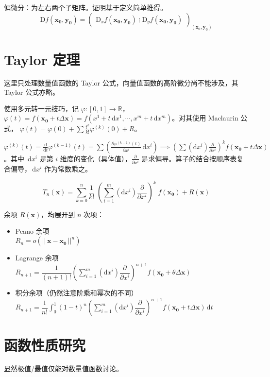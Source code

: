 \documentclass[12pt, a4paper, UTF8, openany]{ctexbook}
\newcommand{\dif}{\mathrm{d}}
\newcommand{\Dif}{\mathrm{D}}
\newcommand{\difx}{\,\mathrm{d}x}
\newcommand{\field}[1]{\mathbb{#1}}%
\newcommand{\mat}[1]{\mathbf{#1}}
\newcommand{\len}[1]{||\, #1 \,||}%
\begin{document}
        偏微分：为左右两个子矩阵。证明基于定义简单推得。
        $$\Dif f(\mat{x_0}, \mat{y_0}) = \begin{pmatrix}
            \Dif_x f(\mat{x_0}, \mat{y_0}) \; \vdots \; \Dif_y f(\mat{x_0}, \mat{y_0})
        \end{pmatrix}_{(\mat{x_0}, \mat{y_0})}$$

    \section{Taylor 定理}
    这里只处理数量值函数的 Taylor 公式，向量值函数的高阶微分尚不能涉及，其 Taylor 公式亦略。

    使用{\heiti 多元转一元技巧}，记 $\varphi: [0, 1] \to \field{R}$，$\varphi(t) = f(\mat{x_0} + t\Delta\mat{x}) = f(x^1 + t\difx^1, \cdots, x^m + t\difx^m)$。对其使用 Maclaurin 公式， $\varphi(t) = \varphi(0) + \sum \frac{t^k}{k!} \varphi^{(k)}(0) + R$。
    
    $\varphi^{(k)}(t) = \frac{\dif}{\dif t} \varphi^{(k - 1)}(t) = \sum (\frac{\partial \varphi^{(k - 1)}(t)}{\partial x^i} \difx^i) \implies (\sum (\dif x^i) \frac{\partial}{\partial x^i})^k f(\mat{x_0} + t\Delta\mat{x})$。其中 $\difx^i$ 是第 $i$ 维度的变化（具体值），$\frac{\partial}{\partial x^i}$ 是求偏导。算子的结合按顺序表复合偏导，$\difx^i$ 作为常数乘之。

    $$T_n(\mat{x}) = \sum_{k = 0}^n \frac{1}{k!} \; (\sum_{i = 1}^{m} (\dif x^i) \frac{\partial}{\partial x^i})^k \; f(\mat{x_0}) + R(\mat{x})$$

    余项 $R(\mat{x})$，均展开到 $n$ 次项：
    \begin{itemize}
        \item Peano 余项 \\
            $R_n = o(\len{\mat{x - x_0}}^{n})$
        \item Lagrange 余项 \\
            $R_{n + 1} = \dfrac{1}{(n + 1)!}(\sum_{i = 1}^{m} (\dif x^i) \dfrac{\partial}{\partial x^i})^{n + 1} f(\mat{x_0} + \theta\Delta\mat{x})$
        \item 积分余项（仍然注意阶乘和幂次的不同） \\
            $R_{n + 1} = \dfrac{1}{n!}\int_{0}^{1} (1 - t)^n (\sum_{i = 1}^{m} (\dif x^i) \dfrac{\partial}{\partial x^i})^{n + 1} f(\mat{x_0} + t \Delta\mat{x}) \,\dif t$
    \end{itemize}

    \section{函数性质研究}
    显然极值/最值仅能对数量值函数讨论。
\end{document}
